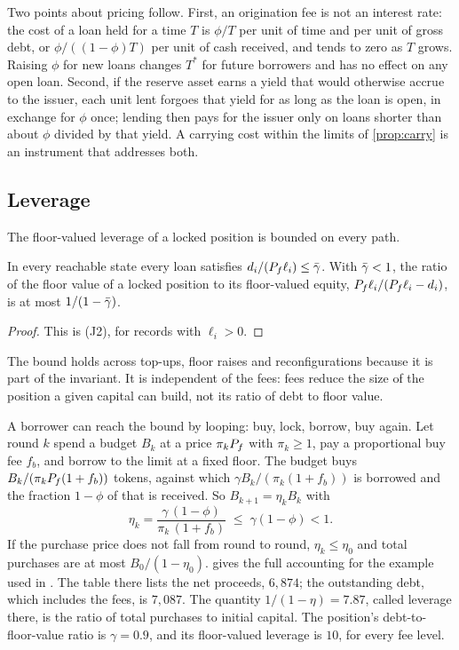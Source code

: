 Two points about pricing follow. First, an origination fee is not an interest rate: the cost of a loan held for a time $T$ is $\phi/T$ per unit of time and per unit of gross debt, or $\phi/((1-\phi)T)$ per unit of cash received, and tends to zero as $T$ grows. Raising $\phi$ for new loans changes $T^\ast$ for future borrowers and has no effect on any open loan. Second, if the reserve asset earns a yield that would otherwise accrue to the issuer, each unit lent forgoes that yield for as long as the loan is open, in exchange for $\phi$ once; lending then pays for the issuer only on loans shorter than about $\phi$ divided by that yield. A carrying cost within the limits of \cref{prop:carry} is an instrument that addresses both.

\subsection{Leverage}

The floor-valued leverage of a locked position is bounded on every path.

\begin{proposition}\label{prop:lev}
In every reachable state every loan satisfies $d_i/(P_f\ell_i)\le\bar\gamma$. With $\bar\gamma<1$, the ratio of the floor value of a locked position to its floor-valued equity, $P_f\ell_i/(P_f\ell_i-d_i)$, is at most $1/(1-\bar\gamma)$.
\end{proposition}
\begin{proof}
This is (J2), for records with $\ell_i>0$.
\end{proof}

The bound holds across top-ups, floor raises and reconfigurations because it is part of the invariant. It is independent of the fees: fees reduce the size of the position a given capital can build, not its ratio of debt to floor value.

A borrower can reach the bound by looping: buy, lock, borrow, buy again. Let round $k$ spend a budget $B_k$ at a price $\pi_kP_f$ with $\pi_k\ge1$, pay a proportional buy fee $f_b$, and borrow to the limit at a fixed floor. The budget buys $B_k/(\pi_kP_f(1+f_b))$ tokens, against which $\gamma B_k/(\pi_k(1+f_b))$ is borrowed and the fraction $1-\phi$ of that is received. So $B_{k+1}=\eta_k B_k$ with
\[
\eta_k=\frac{\gamma\,(1-\phi)}{\pi_k\,(1+f_b)}\;\le\;\gamma(1-\phi)<1 .
\]
If the purchase price does not fall from round to round, $\eta_k\le\eta_0$ and total purchases are at most $B_0/(1-\eta_0)$.  gives the full accounting for the example used in \vone. The table there lists the net proceeds, $6{,}874$; the outstanding debt, which includes the fees, is $7{,}087$. The quantity $1/(1-\eta)=7.87$, called leverage there, is the ratio of total purchases to initial capital. The position's debt-to-floor-value ratio is $\gamma=0.9$, and its floor-valued leverage is $10$, for every fee level.

